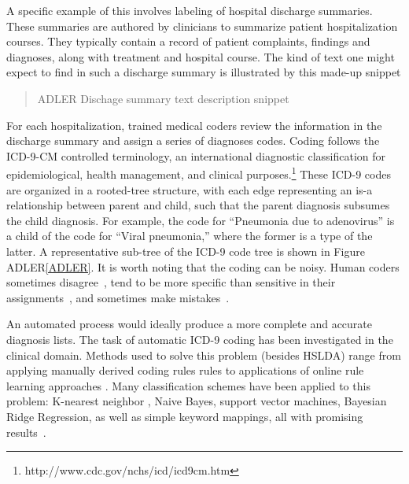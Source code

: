 A specific example of this involves labeling of hospital discharge summaries.  These summaries are authored by clinicians to summarize patient
hospitalization courses. They typically contain a record of patient
complaints, findings and diagnoses, along with treatment and hospital course.  The kind of text one might expect to find in such a discharge summary is illustrated by this made-up snippet
\begin{quote}
{ADLER Dischage summary text description snippet }
\end{quote} 
For each hospitalization, trained medical coders review the information in the
discharge summary and assign a series of diagnoses codes. Coding follows the
ICD-9-CM controlled terminology, an international diagnostic classification for
epidemiological, health management, and clinical
purposes.\footnote{http://www.cdc.gov/nchs/icd/icd9cm.htm}  These ICD-9 codes are organized in a rooted-tree structure, with each
edge representing an is-a relationship between parent and child, such that the
parent diagnosis subsumes the child diagnosis. For example, the code for
{}``Pneumonia due to adenovirus'' is a child of the code for {}``Viral
pneumonia,'' where the former is a type of the latter.  A representative sub-tree of the ICD-9 code tree is shown in Figure ADLER\ref{ADLER}. It is worth noting that
the coding can be noisy. Human coders sometimes disagree~\cite{Challenge07},
tend to be more specific than sensitive in their
assignments~\cite{Birmetal2005}, and sometimes make
mistakes~\cite{FarzandipourEtAl10}.

An automated process would ideally produce a more complete and accurate
diagnosis lists. %
The task of automatic ICD-9 coding has been investigated in the clinical
domain.  Methods used to solve this problem (besides HSLDA) range from applying manually derived coding rules
rules to applications of online rule learning approaches \cite{Crammer2007,Goldstein2007,Farkas2008}.
Many classification schemes have been applied to this problem: K-nearest
neighbor , Naive Bayes, support vector machines, Bayesian Ridge Regression, as
well as simple keyword mappings, all with promising
results~\cite{LarkeyCroft95,RibeiroNeto2001,PakhomovEtAl06,Lita2008}.%


